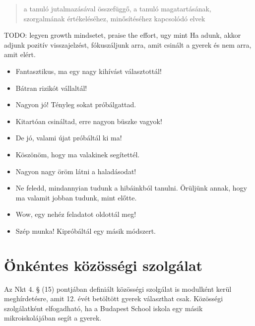 \begin{quote}
a tanuló jutalmazásával összefüggő, a tanuló magatartásának,
szorgalmának értékeléséhez, minősítéséhez kapcsolódó elvek
\end{quote}

TODO: legyen growth mindsetet, praise the effort, ugy mint Ha adunk,
akkor adjunk pozitív visszajelzést, fókuszáljunk arra, amit csinált a
gyerek és nem arra, amit elért.

\begin{itemize}

\item
  Fantasztikus, ma egy nagy kihívást választottál!
\item
  Bátran rizikót vállaltál!
\item
  Nagyon jó! Tényleg sokat próbálgattad.
\item
  Kitartóan csináltad, erre nagyon büszke vagyok!
\item
  De jó, valami újat próbáltál ki ma!
\item
  Köszönöm, hogy ma valakinek segítettél.
\item
  Nagyon nagy öröm látni a haladásodat!
\item
  Ne feledd, mindannyian tudunk a hibáinkból tanulni. Örüljünk annak,
  hogy ma valamit jobban tudunk, mint előtte.
\item
  Wow, egy nehéz feladatot oldottál meg!
\item
  Szép munka! Kipróbáltál egy másik módszert.
\end{itemize}

\section{Önkéntes közösségi
szolgálat}\label{uxf6nkuxe9ntes-kuxf6zuxf6ssuxe9gi-szolguxe1lat}

Az Nkt 4. § (15) pontjában definiált közösségi szolgálat is modulként
kerül meghírdetésre, amit 12. évét betöltött gyerek választhat csak.
Közösségi szolgálatként elfogadható, ha a Budapest School iskola egy
másik mikroiskolájában segít a gyerek.
